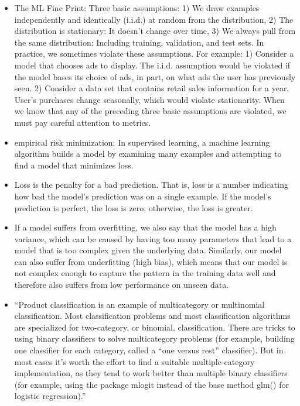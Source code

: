 \documentclass[]{book}
\begin{document}
\begin{itemize}
\item
  The ML Fine Print: Three basic assumptions: 1) We draw examples
  independently and identically (i.i.d.) at random from the
  distribution, 2) The distribution is stationary: It doesn't change
  over time, 3) We always pull from the same distribution: Including
  training, validation, and test sets. In practice, we sometimes violate
  these assumptions. For example: 1) Consider a model that chooses ads
  to display. The i.i.d. assumption would be violated if the model bases
  its choice of ads, in part, on what ads the user has previously seen.
  2) Consider a data set that contains retail sales information for a
  year. User's purchases change seasonally, which would violate
  stationarity. When we know that any of the preceding three basic
  assumptions are violated, we must pay careful attention to metrics.
\item
  empirical risk minimization: In supervised learning, a machine
  learning algorithm builds a model by examining many examples and
  attempting to find a model that minimizes loss.
\item
  Loss is the penalty for a bad prediction. That is, loss is a number
  indicating how bad the model's prediction was on a single example. If
  the model's prediction is perfect, the loss is zero; otherwise, the
  loss is greater.
\item
  If a model suffers from overfitting, we also say that the model has a
  high variance, which can be caused by having too many parameters that
  lead to a model that is too complex given the underlying data.
  Similarly, our model can also suffer from underfitting (high bias),
  which means that our model is not complex enough to capture the
  pattern in the training data well and therefore also suffers from low
  performance on unseen data.
\item
  ``Product classification is an example of multicategory or multinomial
  classification. Most classification problems and most classification
  algorithms are specialized for two-category, or binomial,
  classification. There are tricks to using binary classifiers to solve
  multicategory problems (for example, building one classifier for each
  category, called a ``one versus rest'' classifier). But in most cases
  it's worth the effort to find a suitable multiple-category
  implementation, as they tend to work better than multiple binary
  classifiers (for example, using the package mlogit instead of the base
  method glm() for logistic regression).''
\end{itemize}
\end{document}
